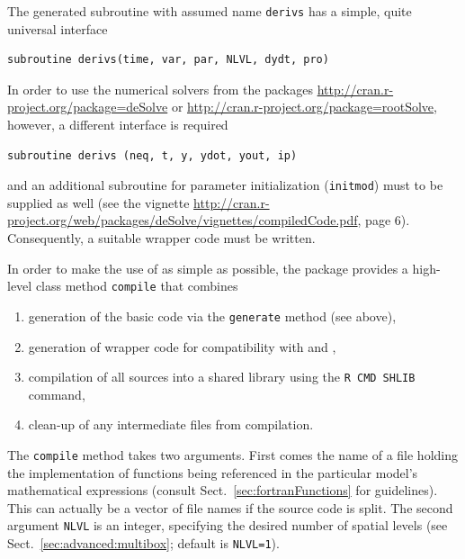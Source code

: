 \documentclass[times,onecolumn]{article}
\begin{document}
The generated  subroutine with assumed name \verb|derivs| has a simple, quite universal interface

\begin{verbatim}
subroutine derivs(time, var, par, NLVL, dydt, pro)
\end{verbatim}

In order to use the numerical solvers from the packages \url{http://cran.r-project.org/package=deSolve} or \url{http://cran.r-project.org/package=rootSolve}, however, a different interface is required

\begin{verbatim}
subroutine derivs (neq, t, y, ydot, yout, ip)
\end{verbatim}

and an additional subroutine for parameter initialization (\verb|initmod|) must to be supplied as well (see the  vignette \url{http://cran.r-project.org/web/packages/deSolve/vignettes/compiledCode.pdf}, page 6). Consequently, a suitable wrapper code must be written.

In order to make the use of  as simple as possible, the  package provides a high-level class method \verb|compile| that combines

\begin{enumerate}
\item generation of the basic  code via the \verb|generate| method (see above),
\item generation of wrapper code for compatibility with  and ,
\item compilation of all  sources into a shared library using the \verb|R CMD SHLIB| command,
\item clean-up of any intermediate files from compilation.
\end{enumerate}

The \verb|compile| method takes two arguments. First comes the name of a file holding the  implementation of functions being referenced in the particular model's mathematical expressions (consult Sect.~\ref{sec:fortranFunctions} for guidelines). This can actually be a vector of file names if the source code is split. The second argument \verb|NLVL| is an integer, specifying the desired number of spatial levels (see Sect.~\ref{sec:advanced:multibox}; default is \verb|NLVL=1|).

\begin{Schunk}
\end{Schunk}
\end{document}
